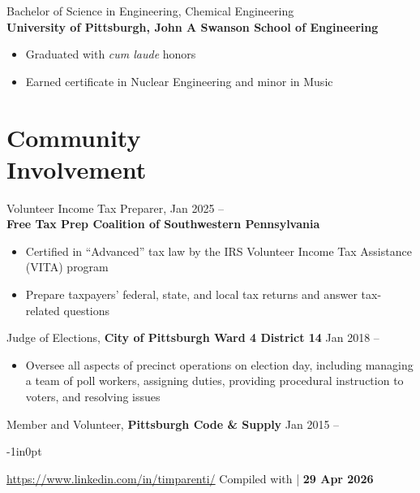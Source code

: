 \documentclass[11pt]{article}
\newcommand{\lmr}{\fontfamily{lmr}\selectfont} %
\newcommand{\textdb}[1]{\fontseries{db}\selectfont#1\normalfont}
\newcommand{\present}{\phantom{Xxx 20XX}}
\begin{document}
\textdb{
Bachelor of Science in Engineering, Chemical Engineering
	\\
}
\textbf{University of Pittsburgh, John A Swanson School of Engineering}
\begin{itemize}
	\item Graduated with \emph{cum laude} honors
	\item Earned certificate in Nuclear Engineering and minor in Music
\end{itemize}



\section{Community\\ Involvement}

\textdb{
Volunteer Income Tax Preparer,
	\hfill Jan 2025 -- \present \\
}
\textbf{Free Tax Prep Coalition of Southwestern Pennsylvania}
\begin{itemize}
	\item Certified in ``Advanced'' tax law by
		the IRS Volunteer Income Tax Assistance (VITA) program
	\item Prepare taxpayers' federal, state, and local tax returns
		and answer tax-related questions
\end{itemize}

\textdb{
Judge of Elections,
\textbf{City of Pittsburgh Ward 4 District 14}
	\hfill Jan 2018 -- \present
}
\begin{itemize}
	\item Oversee all aspects of precinct operations on election day,
		including managing a team of poll workers, assigning duties,
		providing procedural instruction to voters, and resolving issues
\end{itemize}

\textdb{
Member and Volunteer,
\textbf{Pittsburgh Code \& Supply}
	\hfill Jan 2015 -- \present
}



\begin{adjustwidth}{-1in}{0pt}
	\hrulefill \par
	\hypersetup{linkcolor=gray}
	\small
	\url{https://www.linkedin.com/in/timparenti/}
	\hfill {\lmr Compiled with \XeLaTeX}
	| \textbf{29 Apr 2026}
\end{adjustwidth}
\end{document}

